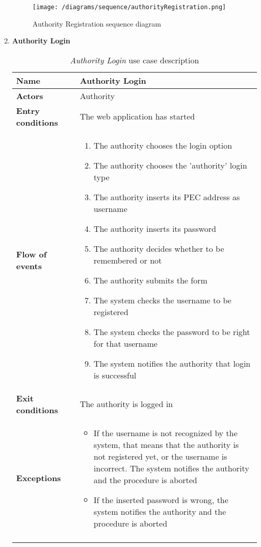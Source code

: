 \begin{enumerate}
				\begin{figure}[h]
					\centering
					\texttt{[image: /diagrams/sequence/authorityRegistration.png]}
					\caption{Authority Registration sequence diagram}
				\end{figure}
			
				\FloatBarrier
			\item \textbf{Authority Login}
				\begin{longtable}{p{0.26\linewidth}p{0.75\linewidth}}
					\toprule
					\textbf{Name} & \textbf{Authority Login} \\
					\midrule
					\textbf{Actors} & Authority\\
					\midrule
					\textbf{Entry conditions} & The web application has started \\
					\midrule
					\textbf{Flow of events} & 
					\begin{enumerate}
						\item The authority chooses the login option
						\item The authority chooses the 'authority' login type
						\item The authority inserts its PEC address as username
						\item The authority inserts its password
						\item The authority decides whether to be remembered or not
						\item The authority submits the form
						\item The system checks the username to be registered
						\item The system checks the password to be right for that username
						\item The system notifies the authority that login is successful
					\end{enumerate} \\
					\midrule
					\textbf{Exit conditions} & The authority is logged in\\
					\midrule
					\textbf{Exceptions} & 
					\begin{itemize}
						\item If the username is not recognized by the system, that means that the authority is not registered yet, or the username is incorrect. The system notifies the authority and the procedure is aborted
						\item If the inserted password is wrong, the system notifies the authority and the procedure is aborted			
					\end{itemize} \\
					\bottomrule
					\caption{\emph{Authority Login} use case description}
				\end{longtable}
			

\end{enumerate}
